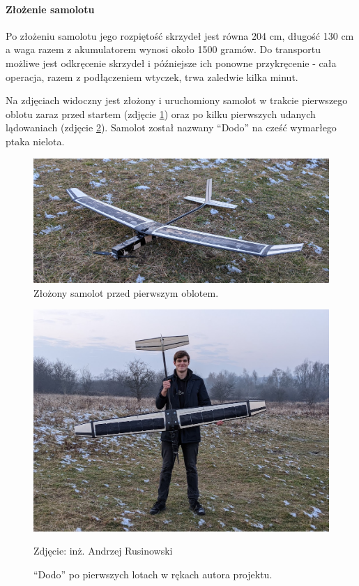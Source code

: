 \documentclass[12pt, a4paper]{article}
\begin{document}
\FloatBarrier
\paragraph{Złożenie samolotu}\mbox{}

Po złożeniu samolotu jego rozpiętość skrzydeł jest równa 204 cm, długość 130 cm a waga razem z akumulatorem wynosi około 1500 gramów. Do transportu możliwe jest odkręcenie skrzydeł i późniejsze ich ponowne przykręcenie - cała operacja, razem z podłączeniem wtyczek, trwa zaledwie kilka minut. 

Na zdjęciach widoczny jest złożony i uruchomiony samolot w trakcie pierwszego oblotu zaraz przed startem (zdjęcie \ref{fig:gotowy}) oraz po kilku pierwszych udanych lądowaniach (zdjęcie \ref{fig:lataxd}). Samolot został nazwany ``Dodo'' na cześć wymarłego ptaka nielota. 

\begin{figure}[ht]
    \centering
    \includegraphics[width=1\textwidth]{dolotu}
    \caption{Złożony samolot przed pierwszym oblotem.}
    \label{fig:gotowy}
\end{figure}

\begin{figure}[ht]
    \centering
    \includegraphics[width=1\textwidth]{budowa16}
    \caption{``Dodo'' po pierwszych lotach w rękach autora projektu.}
    \small Zdjęcie: inż. Andrzej Rusinowski
    \label{fig:lataxd}
\end{figure}
\end{document}
